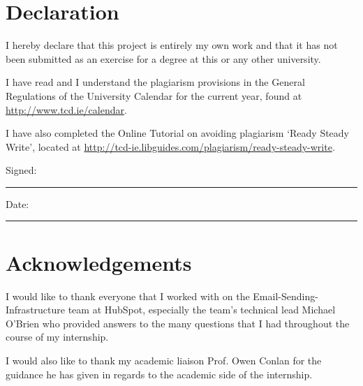 \section*{\Huge{Declaration}}
\vspace{1cm}
I hereby declare that this project is entirely my own work and that it has not been submitted as an exercise for a degree at this or any other university.

\vspace{1cm}
I have read and I understand the plagiarism provisions in the General Regulations of the University Calendar for the current year, found at \url{http://www.tcd.ie/calendar}.
\vspace{1cm}

I have also completed the Online Tutorial on avoiding plagiarism `Ready Steady Write', located at
\url{http://tcd-ie.libguides.com/plagiarism/ready-steady-write}.
\vspace{3cm}

Signed:~\rule{5cm}{0.3pt}\hfill Date:~\rule{5cm}{0.3pt}

\newpage
\onehalfspacing\raggedright %

\section*{\Huge{Acknowledgements}}
I would like to thank everyone that I worked with on the Email-Sending-Infrastructure team at HubSpot, especially the team's technical lead Michael O'Brien who provided answers to the many questions that I had throughout the course of my internship. 


I would also like to thank my academic liaison Prof. Owen Conlan for the guidance he has given in regards to the academic side of the internship.

\tableofcontents
\listoffigures
\listoftables
\lstlistoflistings
\newpage


